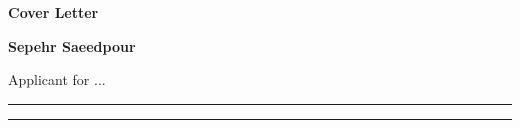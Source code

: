\documentclass[12pt,a4paper]{article}
\newcommand{\decorativerule}{\noindent\textcolor{accentColor}{\rule{\linewidth}{0.8pt}}}
\begin{document}
\begin{center}
    {\Huge\textbf{\textcolor{sectionColor}{Cover Letter}}}

    \vspace{0.1cm}
    {\Large\textbf{\textcolor{sectionColor}{Sepehr Saeedpour}}}

    \vspace{0.1cm}
    {\small{Applicant for ... }}


\end{center}

\vspace{0.1cm}
\decorativerule
\vspace{0.1cm}

\setlength{\baselineskip}{1\baselineskip}



\decorativerule
\end{document}
